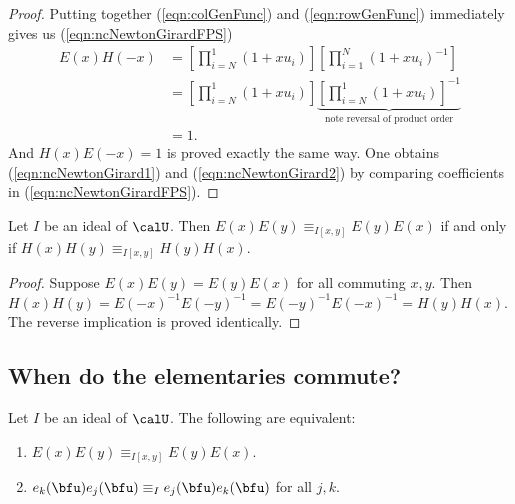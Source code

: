 \documentclass{article}
\begin{document}
\begin{proof}
    Putting together (\ref{eqn:colGenFunc}) and (\ref{eqn:rowGenFunc}) immediately gives us (\ref{eqn:ncNewtonGirardFPS})
    \begin{align*}
        E(x)H(-x)
        &=
        \left[
            \prod_{i=N}^1
            (1+xu_i)
        \right]
        \left[
            \prod_{i=1}^N
            (1+xu_i)^{-1}
        \right]
        \\
        &=
        \left[
            \prod_{i=N}^1
            (1+xu_i)
        \right]
        \underbrace{
            \left[
                \prod_{i=N}^1
                (1+xu_i)
            \right]^{-1}
        }_{\text{note reversal of product order}}
        \\
        &=
        1.
    \end{align*}
    And $H(x)E(-x)=1$ is proved exactly the same way.
    One obtains (\ref{eqn:ncNewtonGirard1}) and (\ref{eqn:ncNewtonGirard2}) by comparing coefficients in (\ref{eqn:ncNewtonGirardFPS}).
\end{proof}



\begin{corollary}
    \label{corr:ECommutesIffHCommutes}
    Let $I$ be an ideal of $\calU$.
    Then $E(x)E(y) \equiv_{I[x,y]} E(y)E(x)$ if and only if $H(x)H(y) \equiv_{I[x,y]} H(y)H(x)$.
\end{corollary}

\begin{proof}
    Suppose $E(x)E(y) = E(y)E(x)$ for all commuting $x,y$.
    Then $H(x)H(y) = E(-x)^{-1}E(-y)^{-1} = E(-y)^{-1}E(-x)^{-1} = H(y)H(x)$.
    The reverse implication is proved identically.
\end{proof}

\subsection{
    When do the elementaries commute?
}

\begin{lemma}
    \label{lem:ElementariesCommuteIffECommutes}
    Let $I$ be an ideal of $\calU$.
    The following are equivalent:
    \begin{enumerate}[label=(\alph*)]
        \item 
            $E(x)E(y) \equiv_{I[x,y]} E(y)E(x)$.
        \item 
            $e_k(\bfu)e_j(\bfu) \equiv_I e_j(\bfu)e_k(\bfu)$ for all $j,k$. 
    \end{enumerate}
\end{lemma}
\end{document}
